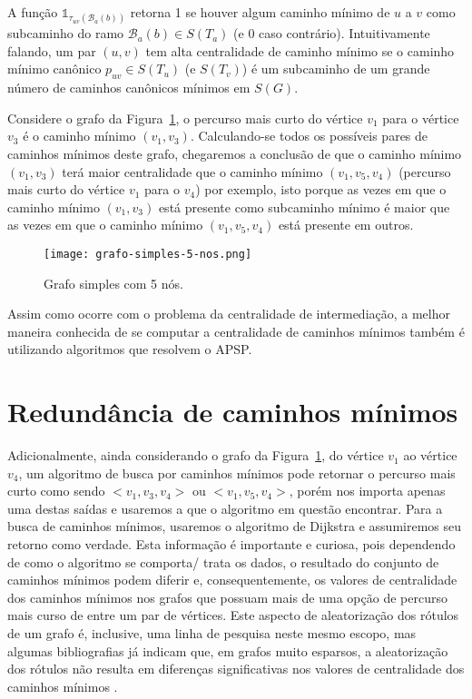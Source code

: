 A função $\mathbb{1}_{\tau_{uv}(\mathcal{B}_a(b))}$ retorna 1 se houver algum caminho mínimo de $u$ a $v$ como subcaminho do ramo $\mathcal{B}_a(b) \in S (T_a)$ (e 0 caso contrário). Intuitivamente falando, um par $(u, v)$ tem alta centralidade de caminho mínimo se o caminho mínimo canônico $p_{uv} \in S(T_u)$ (e $S(T_v)$) é um subcaminho de um grande número de caminhos canônicos mínimos em $S(G)$.

Considere o grafo da Figura~\ref{sec3:grafo-simples-5-nos}, o percurso mais curto do vértice $v_1$ para o vértice $v_3$ é o caminho mínimo $(v_1, v_3)$. Calculando-se todos os possíveis pares de caminhos mínimos deste grafo, chegaremos a conclusão de que o caminho mínimo $(v_1, v_3)$ terá maior centralidade que o caminho mínimo $(v_1, v_5, v_4)$ (percurso mais curto do vértice $v_1$ para o $v_4$) por exemplo, isto porque as vezes em que o caminho mínimo $(v_1, v_3)$ está presente como subcaminho mínimo é maior que as vezes em que o caminho mínimo $(v_1, v_5, v_4)$ está presente em outros.

\begin{figure}[!htb]
    \centering
	\texttt{[image: grafo-simples-5-nos.png]}
    \caption{Grafo simples com 5 nós.}
    \label{sec3:grafo-simples-5-nos}
\end{figure}

Assim como ocorre com o problema da centralidade de intermediação, a melhor maneira conhecida de se computar a centralidade de caminhos mínimos também é utilizando algoritmos que resolvem o APSP.

\section{Redundância de caminhos mínimos}
Adicionalmente, ainda considerando o grafo da Figura~\ref{sec3:grafo-simples-5-nos}, do vértice $v_1$ ao vértice $v_4$, um algoritmo de busca por caminhos mínimos pode retornar o percurso mais curto como sendo $<v_1, v_3, v_4>$ ou $<v_1, v_5, v_4>$, porém nos importa apenas uma destas saídas e usaremos a que o algoritmo em questão encontrar. Para a busca de caminhos mínimos, usaremos o algoritmo de Dijkstra e assumiremos seu retorno como verdade. Esta informação é importante e curiosa, pois dependendo de como o algoritmo se comporta/ trata os dados, o resultado do conjunto de caminhos mínimos podem diferir e, consequentemente, os valores de centralidade dos caminhos mínimos nos grafos que possuam mais de uma opção de percurso mais curso de entre um par de vértices. Este aspecto de aleatorização dos rótulos de um grafo é, inclusive, uma linha de pesquisa neste mesmo escopo, mas algumas bibliografias já indicam que, em grafos muito esparsos, a aleatorização dos rótulos não resulta em diferenças significativas nos valores de centralidade dos caminhos mínimos \cite{alane2021}.